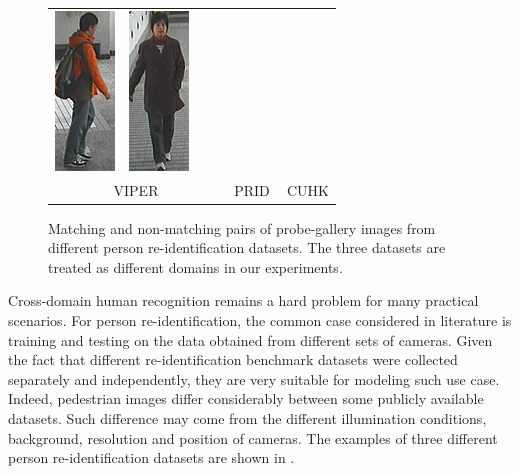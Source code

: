 \begin{figure}
\begin{tabular}{cccc|cccc|cccc}
\includegraphics[height=\reidheight]{Chapters/gradrev/figures/dataset_samples/cuhk/a/002_00280.png}&
\includegraphics[height=\reidheight]{Chapters/gradrev/figures/dataset_samples/cuhk/b/003_00403.png}\\
\multicolumn{4}{c}{VIPER}&
\multicolumn{4}{c}{PRID}&
\multicolumn{4}{c}{CUHK}
\end{tabular}
\caption{Matching and non-matching pairs of probe-gallery images from different person re-identification datasets. The three datasets are treated as different domains in our experiments.}
\label{fig:reidsamples}
\end{figure}





Cross-domain human recognition remains a hard problem for many practical scenarios. 
For person re-identification, the common case considered in literature is training and testing on the data obtained from different sets of cameras. Given the fact that different re-identification benchmark datasets were collected separately and independently, they are very suitable for modeling such use case. Indeed, pedestrian images differ considerably between some publicly available datasets. Such difference may come from the different illumination conditions, background, resolution and position of cameras. The examples of three different person re-identification datasets are shown in .

